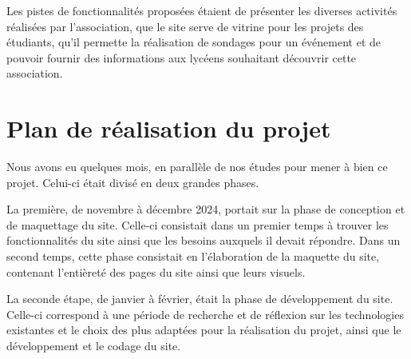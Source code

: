 Les pistes de fonctionnalités proposées étaient de présenter les diverses activités réalisées par l’association, que le site serve de vitrine pour les projets des étudiants, qu'il permette la réalisation de sondages pour un événement et de pouvoir fournir des informations aux lycéens souhaitant découvrir cette association.

\section{Plan de réalisation du projet}
\label{sec:plan-realisation}

Nous avons eu quelques mois, en parallèle de nos études pour mener à bien ce projet. Celui-ci était divisé en deux grandes phases.
\bigskip

La première, de novembre à décembre 2024, portait sur la phase de conception et de maquettage du site. Celle-ci consistait dans un premier temps à trouver les fonctionnalités du site ainsi que les besoins auxquels il devait répondre. Dans un second temps, cette phase consistait en l'élaboration de la maquette du site, contenant l'entièreté des pages du site ainsi que leurs visuels.
\bigskip

La seconde étape, de janvier à février, était la phase de développement du site. Celle-ci correspond à une période de recherche et de réflexion sur les technologies existantes et le choix des plus adaptées pour la réalisation du projet, ainsi que le développement et le codage du site.
